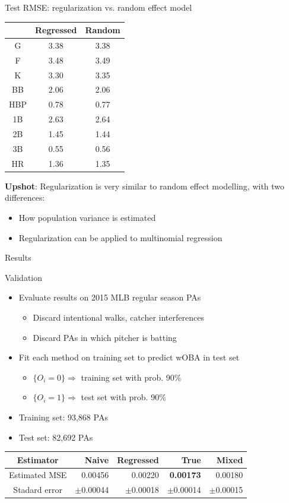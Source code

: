 \documentclass{beamer}
\begin{document}
\begin{frame}{Test RMSE: regularization vs. random effect model}
\begin{center}
\begin{tabular}{c|cc}
    & Regressed & Random\\
    \hline
G   & 3.38      & 3.38\\
F   & 3.48      & 3.49\\
K   & 3.30      & 3.35\\
BB  & 2.06      & 2.06\\
HBP & 0.78      & 0.77\\
1B  & 2.63      & 2.64\\
2B  & 1.45      & 1.44\\
3B  & 0.55      & 0.56\\
HR  & 1.36      & 1.35
\end{tabular}
\end{center}
{\bf Upshot}: Regularization is very similar to random effect modelling, with
two differences:
\begin{itemize}
    \item How population variance is estimated
    \item Regularization can be applied to multinomial regression
\end{itemize}
\end{frame}

\begin{frame}
\centering\Huge Results
\end{frame}

\begin{frame}{Validation}
\begin{itemize}
\item Evaluate results on 2015 MLB regular season PAs
\begin{itemize}
    \item Discard intentional walks, catcher interferences
    \item Discard PAs in which pitcher is batting
\end{itemize}
\item Fit each method on training set to predict wOBA in test set
\begin{itemize}
    \item $\{O_i = 0\} \Rightarrow$ training set with prob. 90\%
    \item $\{O_i = 1\} \Rightarrow$ test set with prob. 90\%
\end{itemize}
\item Training set: 93,868 PAs
\item Test set: 82,692 PAs
\end{itemize}
\begin{center}
\begin{tabular}{c|rrrr}
Estimator           &  Naive    & Regressed & True          & Mixed\\
\hline
Estimated MSE      & 0.00456   & 0.00220   & {\bf 0.00173} & 0.00180\\
Stadard error       &$\pm$0.00044&$\pm$0.00018&$\pm$0.00014 &$\pm$0.00015
\end{tabular}
\end{center}
\end{frame}
\end{document}
